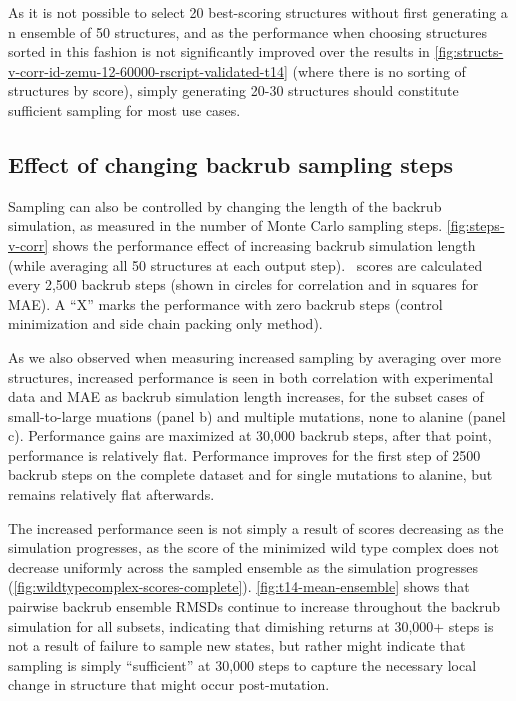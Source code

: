 As it is not possible to select 20 best-scoring structures without first generating a n ensemble of 50 structures, and as the performance when choosing structures sorted in this fashion is not significantly improved over the results in \cref{fig:structs-v-corr-id-zemu-12-60000-rscript-validated-t14} (where there is no sorting of structures by score), simply generating 20-30 structures should constitute sufficient sampling for most use cases.

\subsection{Effect of changing backrub sampling steps}

Sampling can also be controlled by changing the length of the backrub simulation, as measured in the number of Monte Carlo sampling steps.
\cref{fig:steps-v-corr} shows the performance effect of increasing backrub simulation length (while averaging all 50 structures at each output step).
\ddg\ scores are calculated every 2,500 backrub steps (shown in circles for correlation and in squares for MAE).
A ``X'' marks the performance with zero backrub steps (control minimization and side chain packing only method).

As we also observed when measuring increased sampling by averaging over more structures, increased performance is seen in both correlation with experimental data and MAE as backrub simulation length increases, for the subset cases of small-to-large muations (panel b) and multiple mutations, none to alanine (panel c).
Performance gains are maximized at 30,000 backrub steps, after that point, performance is relatively flat.
Performance improves for the first step of 2500 backrub steps on the complete dataset and for single mutations to alanine, but remains relatively flat afterwards.

The increased performance seen is not simply a result of scores decreasing as the simulation progresses, as the score of the minimized wild type complex does not decrease uniformly across the sampled ensemble as the simulation progresses (\cref{fig:wildtypecomplex-scores-complete}).
\cref{fig:t14-mean-ensemble} shows that pairwise backrub ensemble RMSDs continue to increase throughout the backrub simulation for all subsets, indicating that dimishing returns at 30,000+ steps is not a result of failure to sample new states, but rather might indicate that sampling is simply ``sufficient'' at 30,000 steps to capture the necessary local change in structure that might occur post-mutation.

